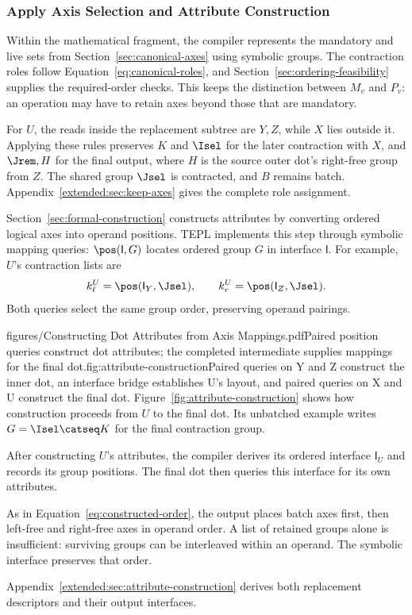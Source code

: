 \FloatBarrier
\subsubsection{Apply Axis Selection and Attribute Construction}
\label{sec:keep-axes}
\label{sec:attribute-construction}
Within the mathematical fragment, the compiler represents the mandatory and
live sets from Section~\ref{sec:canonical-axes} using symbolic groups.
The contraction roles follow Equation~\eqref{eq:canonical-roles}, and
Section~\ref{sec:ordering-feasibility} supplies the required-order checks.
This keeps the distinction between $M_v$ and $P_v$: an operation may have to
retain axes beyond those that are mandatory.

For $U$, the reads inside the replacement subtree are $Y,Z$, while $X$
lies outside it. Applying these rules preserves $K$ and $\Isel$ for the
later contraction with $X$, and $\Jrem,H$ for the final output, where
$H$ is the source outer dot's right-free group from $Z$. The shared group
$\Jsel$ is contracted, and $B$ remains batch.
Appendix~\ref{extended:sec:keep-axes} gives the complete role assignment.

Section~\ref{sec:formal-construction} constructs attributes by converting
ordered logical axes into operand positions. TEPL implements this step
through symbolic mapping queries: $\pos(\mathsf{I},G)$ locates ordered
group $G$ in interface $\mathsf{I}$. For example, $U$'s contraction lists are
\begin{equation}
 k_\ell^U=\pos(\mathsf{I}_Y,\Jsel),\qquad
 k_r^U=\pos(\mathsf{I}_Z,\Jsel).
 \label{eq:symbolic-contraction-queries}
\end{equation}
Both queries select the same group order, preserving operand pairings.

\begin{figuretext}{figures/Constructing Dot Attributes from Axis Mappings.pdf}{Paired position queries construct dot attributes; the completed intermediate supplies mappings for the final dot.}{fig:attribute-construction}{Paired queries on Y and Z construct the inner dot, an interface bridge
establishes U's layout, and paired queries on X and U construct the final dot.}
Figure~\ref{fig:attribute-construction} shows how construction proceeds
from $U$ to the final dot. Its unbatched example writes
$G=\Isel\catseq K$ for the final contraction group.

After constructing $U$'s attributes, the compiler derives its ordered
interface $\mathsf{I}_U$ and records its group positions. The final dot
then queries this interface for its own attributes.

As in Equation~\eqref{eq:constructed-order}, the output places batch axes
first, then left-free and right-free axes in operand order. A list of
retained groups alone is insufficient: surviving groups can be interleaved
within an operand. The symbolic interface preserves that order.

Appendix~\ref{extended:sec:attribute-construction} derives both replacement
descriptors and their output interfaces.
\end{figuretext}

